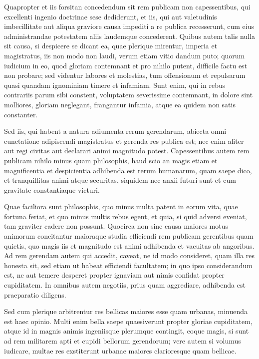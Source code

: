  Quapropter et iis forsitan concedendum sit rem publicam non capessentibus, qui excellenti ingenio doctrinae sese dediderunt, et iis, qui aut valetudinis imbecillitate aut aliqua graviore causa impediti a re publica recesserunt, cum eius administrandae potestatem aliis laudemque concederent. Quibus autem talis nulla sit causa, si despicere se dicant ea, quae plerique mirentur, imperia et magistratus, iis non modo non laudi, verum etiam vitio dandum puto; quorum iudicium in eo, quod gloriam contemnant et pro nihilo putent, difficile factu est non probare; sed videntur labores et molestias, tum offensionum et repulsarum quasi quandam ignominiam timere et infamiam. Sunt enim, qui in rebus contrariis parum sibi constent, voluptatem severissime contemnant, in dolore sint molliores, gloriam neglegant, frangantur infamia, atque ea quidem non satis constanter.

 Sed iis, qui habent a natura adiumenta rerum gerendarum, abiecta omni cunctatione adipiscendi magistratus et gerenda res publica est; nec enim aliter aut regi civitas aut declarari animi magnitudo potest. Capessentibus autem rem publicam nihilo minus quam philosophis, haud scio an magis etiam et magnificentia et despicientia adhibenda est rerum humanarum, quam saepe dico, et tranquillitas animi atque securitas, siquidem nec anxii futuri sunt et cum gravitate constantiaque victuri.

 Quae faciliora sunt philosophis, quo minus multa patent in eorum vita, quae fortuna feriat, et quo minus multis rebus egent, et quia, si quid adversi eveniat, tam graviter cadere non possunt. Quocirca non sine causa maiores motus animorum concitantur maioraque studia efficiendi rem publicam gerentibus quam quietis, quo magis iis et magnitudo est animi adhibenda et vacuitas ab angoribus. Ad rem gerendam autem qui accedit, caveat, ne id modo consideret, quam illa res honesta sit, sed etiam ut habeat efficiendi facultatem; in quo ipso considerandum est, ne aut temere desperet propter ignaviam aut nimis confidat propter cupiditatem. In omnibus autem negotiis, prius quam aggrediare, adhibenda est praeparatio diligens.

 Sed cum plerique arbitrentur res bellicas maiores esse quam urbanas, minuenda est haec opinio. Multi enim bella saepe quaesiverunt propter gloriae cupiditatem, atque id in magnis animis ingeniisque plerumque contingit, eoque magis, si sunt ad rem militarem apti et cupidi bellorum gerendorum; vere autem si volumus iudicare, multae res exstiterunt urbanae maiores clarioresque quam bellicae.

